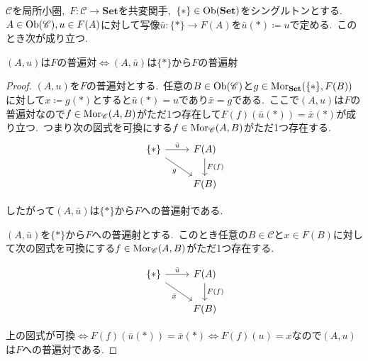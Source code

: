 \begin{proposition} \label{prop: universal_pair_iff_universal_morphism}
$\mathscr{C}$を局所小圏,\ $F \colon \mathscr{C} \to \mathbf{Set}$を共変関手,\ $\{\ast\} \in \operatorname{Ob}(\mathbf{Set})$をシングルトンとする.\
$A \in \operatorname{Ob}(\mathscr{C}), u \in F(A)$に対して写像$\bar{u} \colon \{\ast\} \to F(A)$を$\bar{u}(\ast) \coloneq u$で定める.\
このとき次が成り立つ.
\begin{center}
	$(A, u)$は$F$の普遍対$\iff$$(A, \bar{u})$は$\{\ast\}$から$F$の普遍射
\end{center}
\end{proposition}
\begin{proof}
$(A, u)$を$F$の普遍対とする.\
任意の$B \in \operatorname{Ob}(\mathscr{C})$と$g \in \operatorname{Mor}_{\mathbf{Set}}(\{\ast\}, F(B))$に対して$x \coloneq g(\ast)$とすると$\bar{u}(\ast) = u$であり$\bar{x} = g$である.\
ここで$(A, u)$は$F$の普遍対なので$f \in \operatorname{Mor}_{\mathscr{C}}(A, B)$がただ1つ存在して$F(f)(\bar{u}(\ast)) = \bar{x}(\ast)$が成り立つ.\
つまり次の図式を可換にする$f \in \operatorname{Mor}_{\mathscr{C}}(A, B)$がただ1つ存在する.
\[\begin{tikzcd}
	{\{\ast\}} & {F(A)} \\
	& {F(B)}
	\arrow["{\bar{u}}", from=1-1, to=1-2]
	\arrow["g"', from=1-1, to=2-2]
	\arrow["{F(f)}", from=1-2, to=2-2]
\end{tikzcd}\]

したがって$(A, \bar{u})$は$\{\ast\}$から$F$への普遍射である.

$(A, \bar{u})$を$\{\ast\}$から$F$への普遍射とする.\
このとき任意の$B \in \mathscr{C}$と$x \in F(B)$に対して次の図式を可換にする$f \in \operatorname{Mor}_{\mathscr{C}}(A, B)$がただ1つ存在する.

\[\begin{tikzcd}
	{\{\ast\}} & {F(A)} \\
	& {F(B)}
	\arrow["{\bar{u}}", from=1-1, to=1-2]
	\arrow["{\bar{x}}"', from=1-1, to=2-2]
	\arrow["{F(f)}", from=1-2, to=2-2]
\end{tikzcd}\]

上の図式が可換$\iff F(f)(\bar{u}(\ast)) = \bar{x}(\ast) \iff F(f)(u) = x$なので$(A, u)$は$F$への普遍対である.
\end{proof}
